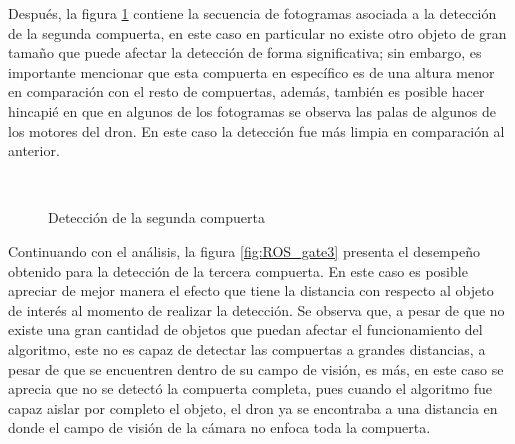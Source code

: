 Después, la figura \ref{fig:ROS_gate2} contiene la secuencia de fotogramas asociada a la detección de la segunda compuerta, en este caso en particular no existe otro objeto de gran tamaño que puede afectar la detección de forma significativa; sin embargo, es importante mencionar que esta compuerta en específico es de una altura menor en comparación con el resto de compuertas, además, también es posible hacer hincapié en que en algunos de los fotogramas se observa las palas de algunos de los motores del dron. En este caso la detección fue más limpia en comparación al anterior.

\begin{figure}[ht]
    \centering
     \hspace{0.2 pt}
     \hspace{0.2 pt}
     \hspace{0.2 pt}
     \\
     \hspace{0.2 pt}
     \hspace{0.2 pt}
     \hspace{0.2 pt}
    
    \caption{Detección de la segunda compuerta}
    \label{fig:ROS_gate2}
\end{figure}


Continuando con el análisis, la figura \ref{fig:ROS_gate3} presenta el desempeño obtenido para la detección de la tercera compuerta. En este caso es posible apreciar de mejor manera el efecto que tiene la distancia con respecto al objeto de interés al momento de realizar la detección. Se observa que, a pesar de que no existe una gran cantidad de objetos que puedan afectar el funcionamiento del algoritmo, este no es capaz de detectar las compuertas a grandes distancias, a pesar de que se encuentren dentro de su campo de visión, es más, en este caso se aprecia que no se detectó la compuerta completa, pues cuando el algoritmo fue capaz aislar por completo el objeto, el dron ya se encontraba a una distancia en donde el campo de visión de la cámara no enfoca toda la compuerta.

